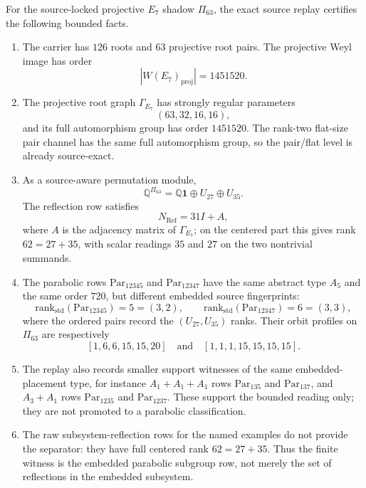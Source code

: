 \begin{proposition}
\label{prop:e7-root-shadow-control}
For the source-locked projective \(E_7\) shadow \(\Pi_{63}\), the exact source replay certifies the following bounded facts.
\begin{enumerate}[label=\textup{(\alph*)},leftmargin=*]
  \item The carrier has \(126\) roots and \(63\) projective root pairs.  The projective Weyl image has order
  \[
    |W(E_7)_{\mathrm{proj}}|=1451520.
  \]
  \item The projective root graph \(\Gamma_{E_7}\) has strongly regular parameters
  \[
    (63,32,16,16),
  \]
  and its full automorphism group has order \(1451520\).  The rank-two flat-size pair channel has the same full automorphism group, so the pair/flat level is already source-exact.
  \item As a source-aware permutation module,
  \[
    \mathbb Q^{\Pi_{63}}=\mathbb Q\mathbf 1\oplus U_{27}\oplus U_{35}.
  \]
  The reflection row satisfies
  \[
    N_{\mathrm{Ref}}=31I+A,
  \]
  where \(A\) is the adjacency matrix of \(\Gamma_{E_7}\); on the centered part this gives rank \(62=27+35\), with scalar readings \(35\) and \(27\) on the two nontrivial summands.
  \item The parabolic rows \(\mathrm{Par}_{12345}\) and \(\mathrm{Par}_{12347}\) have the same abstract type \(A_5\) and the same order \(720\), but different embedded source fingerprints:
  \[
    \mathrm{rank}_{\mathrm{std}}(\mathrm{Par}_{12345})=5=(3,2),\qquad
    \mathrm{rank}_{\mathrm{std}}(\mathrm{Par}_{12347})=6=(3,3),
  \]
  where the ordered pairs record the \((U_{27},U_{35})\) ranks.  Their orbit profiles on \(\Pi_{63}\) are respectively
  \[
    [1,6,6,15,15,20]
    \quad\text{and}\quad
    [1,1,1,15,15,15,15].
  \]
  \item The replay also records smaller support witnesses of the same embedded-placement type, for instance \(A_1+A_1+A_1\) rows \(\mathrm{Par}_{135}\) and \(\mathrm{Par}_{137}\), and \(A_3+A_1\) rows \(\mathrm{Par}_{1235}\) and \(\mathrm{Par}_{1237}\).  These support the bounded reading only; they are not promoted to a parabolic classification.
  \item The raw subsystem-reflection rows for the named examples do not provide the separator: they have full centered rank \(62=27+35\).  Thus the finite witness is the embedded parabolic subgroup row, not merely the set of reflections in the embedded subsystem.
\end{enumerate}
\end{proposition}

